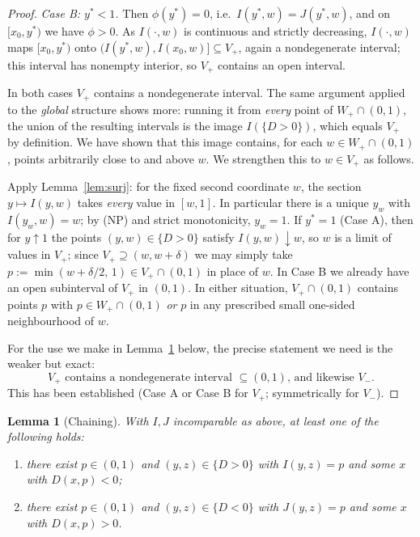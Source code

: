 \documentclass{amsart}
\theoremstyle{plain}
\newtheorem{lemma}{Lemma}
\theoremstyle{definition}
\begin{document}
\begin{proof}
\emph{Case B: $y^\ast<1$.} Then $\phi(y^\ast)=0$, i.e.\ $I(y^\ast,w)=J(y^\ast,w)$, and on
$[x_0,y^\ast)$ we have $\phi>0$. As $I(\cdot,w)$ is continuous and strictly decreasing,
$I(\cdot,w)$ maps $[x_0,y^\ast)$ onto $\bigl(I(y^\ast,w),I(x_0,w)\bigr]\subseteq V_+$,
again a nondegenerate interval; this interval has nonempty interior, so $V_+$ contains an
open interval.

In both cases $V_+$ contains a nondegenerate interval. The same argument applied to the
\emph{global} structure shows more: running it from \emph{every} point of $W_+\cap(0,1)$,
the union of the resulting intervals is the image $I(\{D>0\})$, which equals $V_+$ by
definition. We have shown that this image contains, for each $w\in W_+\cap(0,1)$, points
arbitrarily close to and above $w$. We strengthen this to $w\in V_+$ as follows.

Apply Lemma~\ref{lem:surj}: for the fixed second coordinate $w$, the section
$y\mapsto I(y,w)$ takes \emph{every} value in $[w,1]$. In particular there is a unique
$y_w$ with $I(y_w,w)=w$; by (NP) and strict monotonicity, $y_w=1$. If $y^\ast=1$ (Case A),
then for $y\uparrow1$ the points $(y,w)\in\{D>0\}$ satisfy $I(y,w)\downarrow w$, so $w$ is a
limit of values in $V_+$; since $V_+\supseteq(w,w+\delta)$ we may simply take
$p:=\min(w+\delta/2,\,1)\in V_+\cap(0,1)$ in place of $w$. In Case B we already have an open
subinterval of $V_+$ in $(0,1)$. In either situation, $V_+\cap(0,1)$ contains points
$p$ with $p\in W_+\cap(0,1)$ \emph{or} $p$ in any prescribed small one-sided neighbourhood
of $w$.

For the use we make in Lemma~\ref{lem:chain} below, the precise statement we need is the
weaker but exact:
\begin{equation}\label{eq:Vcontains}
\text{$V_+$ contains a nondegenerate interval $\subseteq(0,1)$, and likewise $V_-$.}
\end{equation}
This has been established (Case A or Case B for $V_+$; symmetrically for $V_-$).
\end{proof}

\begin{lemma}[Chaining]\label{lem:chain}
With $I,J$ incomparable as above, at least one of the following holds:
\begin{enumerate}
\item[\textup{(i)}] there exist $p\in(0,1)$ and $(y,z)\in\{D>0\}$ with $I(y,z)=p$ and some
$x$ with $D(x,p)<0$;
\item[\textup{(ii)}] there exist $p\in(0,1)$ and $(y,z)\in\{D<0\}$ with $J(y,z)=p$ and some
$x$ with $D(x,p)>0$.
\end{enumerate}
\end{lemma}
\end{document}
